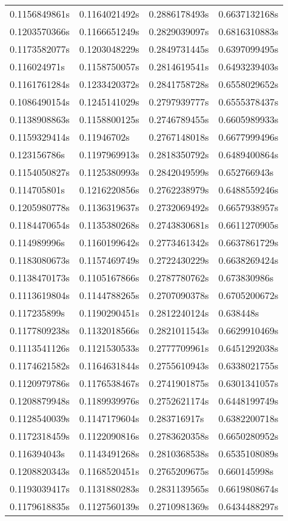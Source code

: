 \begin{table}[]
\begin{tabular}{llll}
    0.1156849861s & 0.1164021492s & 0.2886178493s & 0.6637132168s \\
    0.1203570366s & 0.1166651249s & 0.2829039097s & 0.6816310883s \\
    0.1173582077s & 0.1203048229s & 0.2849731445s & 0.6397099495s \\
    0.116024971s  & 0.1158750057s & 0.2814619541s & 0.6493239403s \\
    0.1161761284s & 0.1233420372s & 0.2841758728s & 0.6558029652s \\
    0.1086490154s & 0.1245141029s & 0.2797939777s & 0.6555378437s \\
    0.1138908863s & 0.1158800125s & 0.2746789455s & 0.6605989933s \\
    0.1159329414s & 0.11946702s   & 0.2767148018s & 0.6677999496s \\
    0.123156786s  & 0.1197969913s & 0.2818350792s & 0.6489400864s \\
    0.1154050827s & 0.1125380993s & 0.2842049599s & 0.652766943s  \\
    0.114705801s  & 0.1216220856s & 0.2762238979s & 0.6488559246s \\
    0.1205980778s & 0.1136319637s & 0.2732069492s & 0.6657938957s \\
    0.1184470654s & 0.1135380268s & 0.2743830681s & 0.6611270905s \\
    0.114989996s  & 0.1160199642s & 0.2773461342s & 0.6637861729s \\
    0.1183080673s & 0.1157469749s & 0.2722430229s & 0.6638269424s \\
    0.1138470173s & 0.1105167866s & 0.2787780762s & 0.673830986s  \\
    0.1113619804s & 0.1144788265s & 0.2707090378s & 0.6705200672s \\
    0.117235899s  & 0.1190290451s & 0.2812240124s & 0.638448s     \\
    0.1177809238s & 0.1132018566s & 0.2821011543s & 0.6629910469s \\
    0.1113541126s & 0.1121530533s & 0.2777709961s & 0.6451292038s \\
    0.1174621582s & 0.1164631844s & 0.2755610943s & 0.6338021755s \\
    0.1120979786s & 0.1176538467s & 0.2741901875s & 0.6301341057s \\
    0.1208879948s & 0.1189939976s & 0.2752621174s & 0.6448199749s \\
    0.1128540039s & 0.1147179604s & 0.283716917s  & 0.6382200718s \\
    0.1172318459s & 0.1122090816s & 0.2783620358s & 0.6650280952s \\
    0.116394043s  & 0.1143491268s & 0.2810368538s & 0.6535108089s \\
    0.1208820343s & 0.1168520451s & 0.2765209675s & 0.660145998s  \\
    0.1193039417s & 0.1131880283s & 0.2831139565s & 0.6619808674s \\
    0.1179618835s & 0.1127560139s & 0.2710981369s & 0.6434488297s
  \end{tabular}
\end{table}

